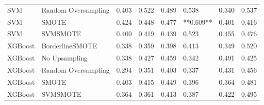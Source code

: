 \begin{tabular}{llllllll}
                         SVM & Random Oversampling & 0.403 &                     0.522 &                 0.489 &                  0.538 &                                   0.340 &    0.537 \\
                         SVM &               SMOTE & 0.424 &                     0.448 &                 0.477 &              **0.609** &                                   0.401 &    0.416 \\
                         SVM &            SVMSMOTE & 0.400 &                     0.419 &                 0.439 &                  0.523 &                                   0.455 &    0.476 \\
                     XGBoost &     BorderlineSMOTE & 0.338 &                     0.359 &                 0.398 &                  0.413 &                                   0.349 &    0.520 \\
                     XGBoost &       No Upsampling & 0.338 &                     0.427 &                 0.459 &                  0.342 &                                   0.491 &    0.425 \\
                     XGBoost & Random Oversampling & 0.294 &                     0.351 &                 0.403 &                  0.337 &                                   0.431 &    0.456 \\
                     XGBoost &               SMOTE & 0.403 &                     0.415 &                 0.449 &                  0.396 &                                   0.364 &    0.481 \\
                     XGBoost &            SVMSMOTE & 0.364 &                     0.361 &                 0.413 &                  0.387 &                                   0.422 &    0.495 \\
\bottomrule
\end{tabular}
